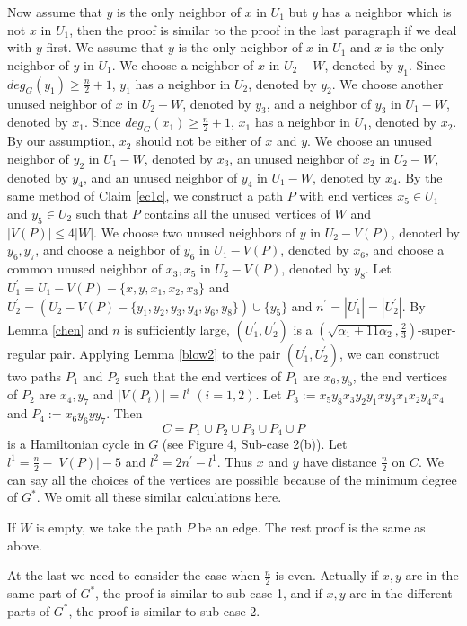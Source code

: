 \documentclass[11pt]{article}
\begin{document}
Now assume that $y$ is the only neighbor of $x$ in $U_1$ but $y$ has a neighbor which is not $x$ in $U_1$, then the proof is similar to the proof in the last paragraph if we deal with $y$ first. We assume that $y$ is the only neighbor of $x$ in $U_1$ and $x$ is the only neighbor of $y$ in $U_1$. We choose a neighbor of $x$ in $U_2-W$, denoted by $y_1$. Since $deg_G(y_1)\geq \frac{n}{2}+1$, $y_1$ has a neighbor in $U_2$, denoted by $y_2$. We choose another unused neighbor of $x$ in $U_2-W$, denoted by $y_3$, and a neighbor of $y_3$ in $U_1-W$, denoted by $x_1$. Since $deg_G(x_1)\geq \frac{n}{2}+1$, $x_1$ has a neighbor in $U_1$, denoted by $x_2$. By our assumption, $x_2$ should not be either of $x$ and $y$. We choose an unused neighbor of $y_2$ in $U_1-W$, denoted by $x_3$, an unused neighbor of $x_2$ in $U_2-W$, denoted by $y_4$, and an unused neighbor of $y_4$ in $U_1-W$, denoted by $x_4$. By the same method of Claim \ref{ec1c}, we construct a path $P$ with end vertices $x_5\in U_1$ and $y_5\in U_2$ such that $P$ contains all the unused vertices of $W$ and $|V(P)|\leq 4|W|$. We choose two unused neighbors of $y$ in $U_2-V(P)$, denoted by $y_6,y_7$, and choose a neighbor of $y_6$ in $U_1-V(P)$, denoted by $x_6$, and choose a common unused neighbor of $x_3,x_5$ in $U_2-V(P)$, denoted by $y_8$. Let $U_1^{'}=U_1-V(P)-\{x,y,x_1,x_2,x_3\}$ and $U_2^{'}=(U_2-V(P)-\{y_1,y_2,y_3,y_4,y_6,y_8\})\cup \{y_5\}$ and $n^{'}=|U_1^{'}|=|U_2^{'}|$. By Lemma \ref{chen} and $n$ is sufficiently large, $(U_1^{'},U_2^{'})$ is a $(\sqrt{\alpha_1+11\alpha_2},\frac{2}{3})$-super-regular pair. Applying Lemma \ref{blow2} to the pair $(U_1^{'},U_2^{'})$, we can construct two paths $P_1$ and $P_2$ such that the end vertices of $P_1$ are $x_6, y_5$, the end vertices of $P_2$ are $x_4, y_7$ and $|V(P_i)|=l^i$ $(i=1,2)$. Let $P_3:=x_5y_8x_3y_2y_1xy_3x_1x_2y_4x_4$ and $P_4:=x_6y_6yy_7$. Then
$$C=P_1\cup P_2\cup P_3\cup P_4\cup P$$
is a Hamiltonian cycle in $G$ (see Figure 4, Sub-case 2(b)). Let $l^1=\frac{n}{2}-|V(P)|-5$ and $l^2=2n^{'}-l^1$. Thus $x$ and $y$ have distance $\frac{n}{2}$ on $C$. We can say all the choices of the vertices are possible because of the minimum degree of $G^*$. We omit all these similar calculations here.

If $W$ is empty, we take the path $P$ be an edge. The rest proof is the same as above.

At the last we need to consider the case when $\frac{n}{2}$ is even. Actually if $x,y$ are in the same part of $G^*$, the proof is similar to sub-case 1, and if $x,y$ are in the different parts of $G^*$, the proof is similar to sub-case 2.
\end{document}
